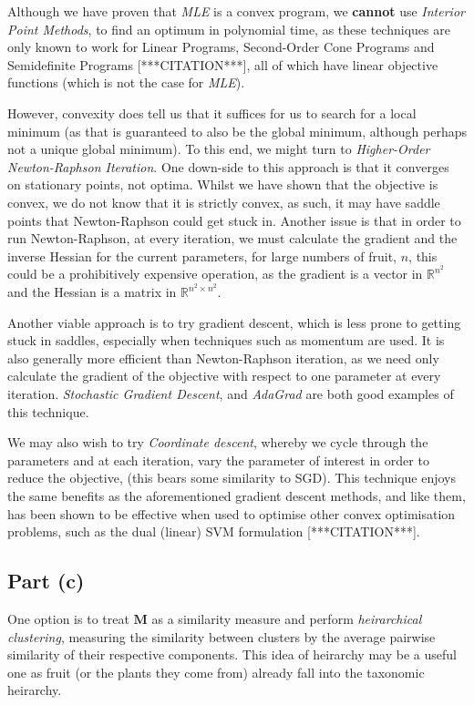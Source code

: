 Although we have proven that \textit{MLE} is a convex program, we \textbf{cannot} use \textit{Interior Point Methods}, to find an optimum in polynomial time, as these techniques are only known to work for Linear Programs, Second-Order Cone Programs and Semidefinite Programs [***CITATION***], all of which have linear objective functions (which is not the case for \textit{MLE}).

However, convexity does tell us that it suffices for us to search for a local minimum (as that is guaranteed to also be the global minimum, although perhaps not a unique global minimum). To this end, we might turn to \textit{Higher-Order Newton-Raphson Iteration}. One down-side to this approach is that it converges on stationary points, not optima. Whilst we have shown that the objective is convex, we do not know that it is strictly convex, as such, it may have saddle points that Newton-Raphson could get stuck in. Another issue is that in order to run Newton-Raphson, at every iteration, we must calculate the gradient and the inverse Hessian for the current parameters, for large numbers of fruit, $n$, this could be a prohibitively expensive operation, as the gradient is a vector in $\mathbb{R}^{n^2}$ and the Hessian is a matrix in $\mathbb{R}^{n^2\times n^2}$.

Another viable approach is to try gradient descent, which is less prone to getting stuck in saddles, especially when techniques such as momentum are used. It is also generally more efficient than Newton-Raphson iteration, as we need only calculate the gradient of the objective with respect to one parameter at every iteration. \textit{Stochastic Gradient Descent}, and \textit{AdaGrad} are both good examples of this technique.

We may also wish to try \textit{Coordinate descent}, whereby we cycle through the parameters and at each iteration, vary the parameter of interest in order to reduce the objective, (this bears some similarity to SGD). This technique enjoys the same benefits as the aforementioned gradient descent methods, and like them, has been shown to be effective when used to optimise other convex optimisation problems, such as the dual (linear) SVM formulation [***CITATION***].

\subsection{Part (c)}

One option is to treat $\mathbf{M}$ as a similarity measure and perform \textit{heirarchical clustering}, measuring the similarity between clusters by the average pairwise similarity of their respective components. This idea of heirarchy may be a useful one as fruit (or the plants they come from) already fall into the taxonomic heirarchy.

